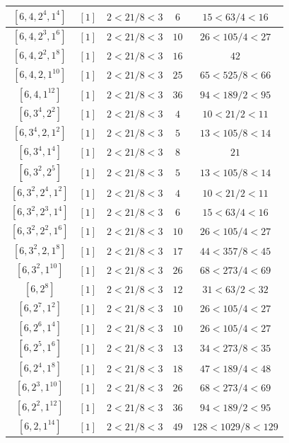 \documentclass{article}%
\begin{document}
\begin{center}
\begin{longtable}{||c|c|c|c|c||}
$[6, 4, 2^{4}, 1^{4}]$ & $[1]$ & $2 < 21/8 < 3$ & $6$ & $15 < 63/4 < 16$ \\ \hline 
$[6, 4, 2^{3}, 1^{6}]$ & $[1]$ & $2 < 21/8 < 3$ & $10$ & $26 < 105/4 < 27$ \\ \hline 
$[6, 4, 2^{2}, 1^{8}]$ & $[1]$ & $2 < 21/8 < 3$ & $16$ & $42$ \\ \hline 
$[6, 4, 2, 1^{10}]$ & $[1]$ & $2 < 21/8 < 3$ & $25$ & $65 < 525/8 < 66$ \\ \hline 
$[6, 4, 1^{12}]$ & $[1]$ & $2 < 21/8 < 3$ & $36$ & $94 < 189/2 < 95$ \\ \hline 
$[6, 3^{4}, 2^{2}]$ & $[1]$ & $2 < 21/8 < 3$ & $4$ & $10 < 21/2 < 11$ \\ \hline 
$[6, 3^{4}, 2, 1^{2}]$ & $[1]$ & $2 < 21/8 < 3$ & $5$ & $13 < 105/8 < 14$ \\ \hline 
$[6, 3^{4}, 1^{4}]$ & $[1]$ & $2 < 21/8 < 3$ & $8$ & $21$ \\ \hline 
$[6, 3^{2}, 2^{5}]$ & $[1]$ & $2 < 21/8 < 3$ & $5$ & $13 < 105/8 < 14$ \\ \hline 
$[6, 3^{2}, 2^{4}, 1^{2}]$ & $[1]$ & $2 < 21/8 < 3$ & $4$ & $10 < 21/2 < 11$ \\ \hline 
$[6, 3^{2}, 2^{3}, 1^{4}]$ & $[1]$ & $2 < 21/8 < 3$ & $6$ & $15 < 63/4 < 16$ \\ \hline 
$[6, 3^{2}, 2^{2}, 1^{6}]$ & $[1]$ & $2 < 21/8 < 3$ & $10$ & $26 < 105/4 < 27$ \\ \hline 
$[6, 3^{2}, 2, 1^{8}]$ & $[1]$ & $2 < 21/8 < 3$ & $17$ & $44 < 357/8 < 45$ \\ \hline 
$[6, 3^{2}, 1^{10}]$ & $[1]$ & $2 < 21/8 < 3$ & $26$ & $68 < 273/4 < 69$ \\ \hline 
$[6, 2^{8}]$ & $[1]$ & $2 < 21/8 < 3$ & $12$ & $31 < 63/2 < 32$ \\ \hline 
$[6, 2^{7}, 1^{2}]$ & $[1]$ & $2 < 21/8 < 3$ & $10$ & $26 < 105/4 < 27$ \\ \hline 
$[6, 2^{6}, 1^{4}]$ & $[1]$ & $2 < 21/8 < 3$ & $10$ & $26 < 105/4 < 27$ \\ \hline 
$[6, 2^{5}, 1^{6}]$ & $[1]$ & $2 < 21/8 < 3$ & $13$ & $34 < 273/8 < 35$ \\ \hline 
$[6, 2^{4}, 1^{8}]$ & $[1]$ & $2 < 21/8 < 3$ & $18$ & $47 < 189/4 < 48$ \\ \hline 
$[6, 2^{3}, 1^{10}]$ & $[1]$ & $2 < 21/8 < 3$ & $26$ & $68 < 273/4 < 69$ \\ \hline 
$[6, 2^{2}, 1^{12}]$ & $[1]$ & $2 < 21/8 < 3$ & $36$ & $94 < 189/2 < 95$ \\ \hline 
$[6, 2, 1^{14}]$ & $[1]$ & $2 < 21/8 < 3$ & $49$ & $128 < 1029/8 < 129$ \\ \hline 

\end{longtable}
\end{center}
\end{document}

